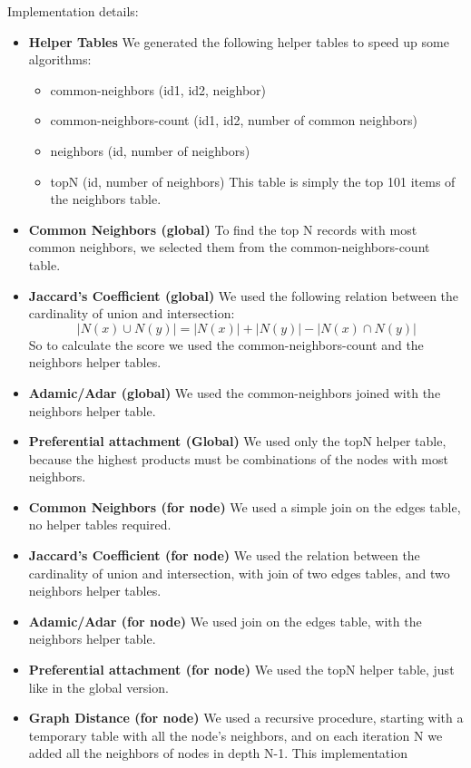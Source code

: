 Implementation details:
\begin{itemize}
	\item {\bf Helper Tables} 
        We generated the following helper tables to speed up some algorithms:
		\begin{itemize}
			\item {common-neighbors (id1, id2, neighbor)}
			\item {common-neighbors-count (id1, id2, number of common neighbors)}
			\item {neighbors (id, number of neighbors)}
			\item {topN (id, number of neighbors)}
				This table is simply the top 101 items of the neighbors table.
		\end{itemize}
	\item {\bf Common Neighbors (global)} 
		To find the top N records with most common neighbors, 
		we selected them from the common-neighbors-count table.
	\item {\bf Jaccard's Coefficient (global)} 
		We used the following relation between the cardinality of union and intersection:
		\[{|N(x) \cup N(y)|} = {|N(x)| + |N(y)| - |N(x) \cap N(y)|}\]
		So to calculate the score we used the common-neighbors-count and the neighbors helper tables.
	\item {\bf Adamic/Adar (global)} 
		We used the common-neighbors joined with the neighbors helper table.
	\item {\bf Preferential attachment (Global)}
		We used only the topN helper table, because the highest products 
		must be combinations of the nodes with most neighbors.
	\item {\bf Common Neighbors (for node)}
		We used a simple join on the edges table, no helper tables required.
	\item {\bf Jaccard's Coefficient (for node)}
		We used the relation between the cardinality of union and intersection,
		with join of two edges tables, and two neighbors helper tables.
	\item {\bf Adamic/Adar (for node)}
		We used join on the edges table, with the neighbors helper table.
	\item {\bf Preferential attachment (for node)}
		We used the topN helper table, just like in the global version.
	\item {\bf Graph Distance (for node)}
		We used a recursive procedure, starting with a temporary table with all the node's neighbors,
		and on each iteration N we added all the neighbors of nodes in depth N-1. This implementation

\end{itemize}
